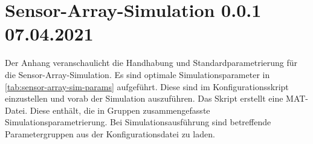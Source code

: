 %

\chapter{Sensor-Array-Simulation 0.0.1 07.04.2021}\label{ch:sensor-array-sim}


Der Anhang veranschaulicht die Handhabung und Standardparametrierung für die Sensor-Array-Simulation. Es sind optimale Simulationsparameter in \autoref{tab:sensor-array-sim-params} aufgeführt. Diese sind im Konfigurationsskript einzustellen und vorab der Simulation auszuführen. Das Skript erstellt eine MAT-Datei. Diese enthält, die in Gruppen zusammengefasste Simulationsparametrierung. Bei Simulationsausführung sind betreffende Parametergruppen aus der Konfigurationsdatei zu laden.


